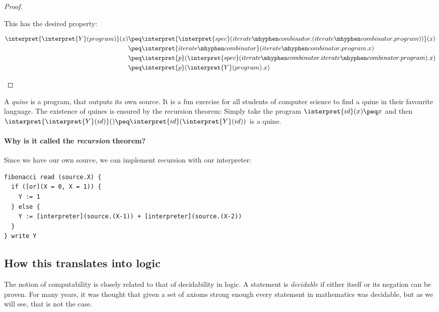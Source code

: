 \begin{proof}
\begin{enumerate}
			This has the desired property:

			\begin{equation*}
				\begin{split}
					\interpret{\interpret{Y}(program)}(x) 
					&\peq \interpret{\interpret{spec}(iterate\mhyphen
				combinator.(iterate\mhyphen combinator.program))}(x)\\
				&\peq \interpret{iterate\mhyphen combinator}(iterate\mhyphen combinator.program.x) \\
				&\peq \interpret{p}(\interpret{spec}(iterate\mhyphen combinator.iterate\mhyphen combinator.program).x)\\
				&\peq \interpret{p}(\interpret{Y}(program).x)
				\end{split}
			\end{equation*}
	\end{enumerate}
\end{proof}

\begin{example}[Quines]
	A {\em quine}\/ is a program, that outputs its own source. It is a fun 
	exercise for all students of computer science to find a quine in their 
	favourite language. The existence of quines is ensured by the recursion theorem:
	Simply take the program $\interpret{id}(x)\peq x$ and then 
	$\interpret{\interpret{Y}(id)}() \peq \interpret{id}(\interpret{Y}(id))$ 
	is a quine.
\end{example}

\paragraph{Why is it called the {\em recursion} theorem?}
Since we have our own source, we can implement recursion with our interpreter:
\begin{verbatim}
fibonacci read (source.X) {
  if ([or](X = 0, X = 1)) {
    Y := 1
  } else {
    Y := [interpreter](source.(X-1)) + [interpreter](source.(X-2))
  }
} write Y
\end{verbatim}

\subsection{How this translates into logic}
The notion of computability is closely related to that of decidability in 
logic. A statement is {\em decidable}\/ if either itself or its negation can be 
proven. For many years, it was thought that given a set of axioms strong 
enough every statement in mathematics was decidable, but as we will 
see, that is not the case.

